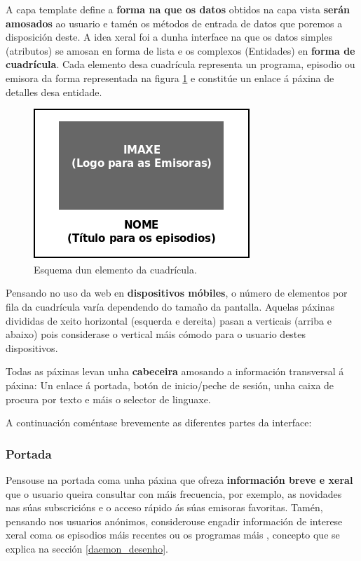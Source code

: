 A capa template define a \textbf{forma na que os datos} obtidos na capa vista \textbf{serán amosados} ao usuario e tamén os métodos de entrada de datos que poremos a disposición deste. A idea xeral foi a dunha interface na que os datos simples (atributos) se amosan en forma de lista e os complexos (Entidades) en \textbf{forma de cuadrícula}. Cada elemento desa cuadrícula representa un programa, episodio ou emisora da forma representada na figura \ref{fig:grella} e constitúe un enlace á páxina de detalles desa entidade.

\begin{figure}[H]
	\centering
	\includegraphics[scale=0.6,keepaspectratio=true]{./images/grella.png}
	\caption{Esquema dun elemento da cuadrícula.}
	\label{fig:grella}
\end{figure}

Pensando no uso da web en \textbf{dispositivos móbiles}, o número de elementos por fila da cuadrícula varía dependendo do tamaño da pantalla. Aquelas páxinas divididas de xeito horizontal (esquerda e dereita)  pasan a verticais (arriba e abaixo) pois considerase o  vertical máis cómodo para o usuario destes dispositivos. 

Todas as páxinas levan unha \textbf{cabeceira} amosando a información transversal á páxina: Un enlace á portada, botón de inicio/peche de sesión, unha caixa de procura por texto e máis o selector de linguaxe. 

A continuación coméntase brevemente as diferentes partes da interface:


\subsubsection{Portada}

Pensouse na portada coma unha páxina que ofreza \textbf{información breve e xeral} que o usuario queira consultar con máis frecuencia, por exemplo, as novidades nas súas subscricións e o acceso rápido ás súas emisoras favoritas. Tamén, pensando nos usuarios anónimos, considerouse engadir información de interese xeral coma os episodios máis recentes ou os programas máis , concepto que se explica na sección \ref{daemon_desenho}.

